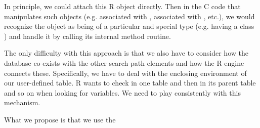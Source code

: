 \documentclass{article}
\begin{document}
In principle, we could attach this R object directly.  Then in the C
code that manipulates such objects (e.g.  associated
with ,  associated with
, etc.), we would recognize the object as being of a
particular and special type (e.g. having a class )
and handle it by calling its internal method routine.

The only difficulty with this approach is that we also have to
consider how the database co-exists with the other search path
elements and how the R engine connects these.  Specifically, we have
to deal with the enclosing environment of our user-defined table. R
wants to check in one table and then in its parent table and so on
when looking for variables.  We need to play consistently with this
mechanism.


What we propose is that we use the 
\end{document}

